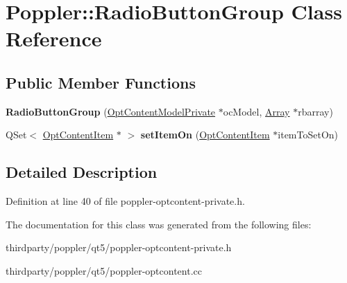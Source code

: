 \hypertarget{class_poppler_1_1_radio_button_group}{}\section{Poppler\+:\+:Radio\+Button\+Group Class Reference}
\label{class_poppler_1_1_radio_button_group}
\subsection*{Public Member Functions}
\begin{DoxyCompactItemize}
\item 
\mbox{\label{class_poppler_1_1_radio_button_group_ac2ebc68f25dda38e2b51dd9df0de2ded}} 
{\bfseries Radio\+Button\+Group} (\hyperlink{class_poppler_1_1_opt_content_model_private}{Opt\+Content\+Model\+Private} $\ast$oc\+Model, \hyperlink{class_array}{Array} $\ast$rbarray)
\item 
\mbox{\label{class_poppler_1_1_radio_button_group_a19c5f9ac69c2e169d753a208f7c0da28}} 
Q\+Set$<$ \hyperlink{class_poppler_1_1_opt_content_item}{Opt\+Content\+Item} $\ast$ $>$ {\bfseries set\+Item\+On} (\hyperlink{class_poppler_1_1_opt_content_item}{Opt\+Content\+Item} $\ast$item\+To\+Set\+On)
\end{DoxyCompactItemize}


\subsection{Detailed Description}


Definition at line 40 of file poppler-\/optcontent-\/private.\+h.



The documentation for this class was generated from the following files\+:\begin{DoxyCompactItemize}
\item 
thirdparty/poppler/qt5/poppler-\/optcontent-\/private.\+h\item 
thirdparty/poppler/qt5/poppler-\/optcontent.\+cc\end{DoxyCompactItemize}
